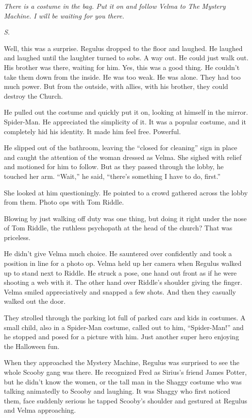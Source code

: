 \documentclass[12pt,twoside,openright]{memoir}
\begin{document}
\textit{There is a costume in the bag. Put it on and follow Velma to The Mystery Machine. I will be waiting for you there.} 

\textit{S.}

Well, this was a surprise. Regulus dropped to the floor and laughed. He laughed and laughed until the laughter turned to sobs. A way out. He could just walk out. His brother was there, waiting for him. Yes, this was a good thing. He couldn't take them down from the inside. He was too weak. He was alone. They had too much power. But from the outside, with allies, with his brother, they could destroy the Church. 

He pulled out the costume and quickly put it on, looking at himself in the mirror. Spider-Man. He appreciated the simplicity of it. It was a popular costume, and it completely hid his identity. It made him feel free. Powerful.

He slipped out of the bathroom, leaving the ``closed for cleaning'' sign in place and caught the attention of the woman dressed as Velma. She sighed with relief and motioned for him to follow. But as they passed through the lobby, he touched her arm. ``Wait,'' he said, ``there's something I have to do, first.'' 

She looked at him questioningly. He pointed to a crowd gathered across the lobby from them. Photo ops with Tom Riddle. 

Blowing by just walking off duty was one thing, but doing it right under the nose of Tom Riddle, the ruthless psychopath at the head of the church? That was priceless. 

He didn't give Velma much choice. He sauntered over confidently and took a position in line for a photo op. Velma held up her camera when Regulus walked up to stand next to Riddle. He struck a pose, one hand out front as if he were shooting a web with it. The other hand over Riddle's shoulder giving the finger. Velma smiled appreciatively and snapped a few shots. And then they casually walked out the door. 

They strolled through the parking lot full of parked cars and kids in costumes. A small child, also in a Spider-Man costume, called out to him, ``Spider-Man!'' and he stopped and posed for a picture with him. Just another super hero enjoying the Halloween fun. 

When they approached the Mystery Machine, Regulus was surprised to see the whole Scooby gang was there. He recognized Fred as Sirius's friend James Potter, but he didn't know the women, or the tall man in the Shaggy costume who was talking animatedly to Scooby and laughing. It was Shaggy who first noticed them, face suddenly serious he tapped Scooby's shoulder and gestured at Regulus and Velma approaching.
\end{document}
